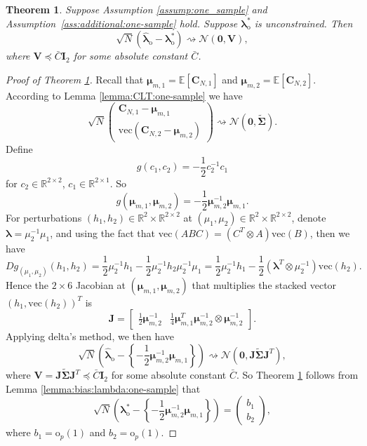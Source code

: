 \documentclass[12pt,letterpaper]{article}
\newtheorem{theorem}{Theorem}[section]
\begin{document}
\begin{theorem}\label{thm:one-sample:asymptotics}
Suppose Assumption \ref{assump:one_sample} and Assumption~\ref{ass:additional:one-sample} hold. Suppose $\boldsymbol{\lambda}_{\mathrm{o}}^*$ is unconstrained. Then 
$$\sqrt{N}\left(\hat{\boldsymbol{\lambda}}_{\mathrm{o}}-\boldsymbol{\lambda}_{\mathrm{o}}^*\right)\rightsquigarrow\mathcal{N}(\mathbf{0},\mathbf{V}),$$ 
where $\mathbf{V}\preceq\bar{C}\mathbf{I}_2$ for some absolute constant $\bar{C}$. 
\end{theorem}
\begin{proof}[Proof of Theorem \ref{thm:one-sample:asymptotics}]
Recall that $\boldsymbol{\mu}_{m,1}=\mathbb{E}[\mathbf{C}_{N,1}]$ and $\boldsymbol{\mu}_{m,2}=\mathbb{E}[\mathbf{C}_{N,2}]$. According to Lemma \ref{lemma:CLT:one-sample} we have  
$$\sqrt{N}\begin{pmatrix}
\mathbf{C}_{N,1}-\boldsymbol{\mu}_{m,1}\\
\mathrm{vec}(\mathbf{C}_{N,2}-\boldsymbol{\mu}_{m,2})
\end{pmatrix}\rightsquigarrow\mathcal{N}\left(\mathbf{0},\widetilde{\boldsymbol{\Sigma}}\right).$$
Define 
$$g(c_1,c_2)=-\frac{1}{2}c_2^{-1}c_1$$ 
for $c_2\in\mathbb{R}^{2\times 2}$, $c_1\in\mathbb{R}^{2\times 1}$. So $$g(\boldsymbol{\mu}_{m,1},\boldsymbol{\mu}_{m,2})=-\frac{1}{2}\boldsymbol{\mu}_{m,2}^{-1}\boldsymbol{\mu}_{m,1}.$$ 
For perturbations $(h_1,h_2)\in\mathbb{R}^2\times\mathbb{R}^{2\times 2}$ at $(\mu_1,\mu_2)\in\mathbb{R}^2\times\mathbb{R}^{2\times 2}$, denote $\boldsymbol{\lambda}=\mu_2^{-1}\mu_1$, and using the fact that $\mathrm{vec}(ABC)=(C^T\otimes A)\mathrm{vec}(B)$, then we have 
$$Dg_{(\mu_1,\mu_2)}(h_1,h_2)=\frac{1}{2}\mu_2^{-1}h_1-\frac{1}{2}\mu_2^{-1}h_2\mu_2^{-1}\mu_1=\frac{1}{2}\mu_2^{-1}h_1-\frac{1}{2}(\boldsymbol{\lambda}^T\otimes\mu_2^{-1})\mathrm{vec}(h_2).$$
Hence the $2\times 6$ Jacobian at $(\boldsymbol{\mu}_{m,1},\boldsymbol{\mu}_{m,2})$ that multiplies the stacked vector $(h_1,\mathrm{vec}(h_2))^T$ is 
$$\mathbf{J}=\begin{bmatrix}
\displaystyle\frac{1}{2}\boldsymbol{\mu}_{m,2}^{-1}&\displaystyle\frac{1}{4}\boldsymbol{\mu}_{m,1}^T\boldsymbol{\mu}_{m,2}^{-1}\otimes\boldsymbol{\mu}_{m,2}^{-1}
\end{bmatrix}.$$
Applying delta's method, we then have 
$$\sqrt{N}\left(\hat{\boldsymbol{\lambda}}_{\mathrm{o}}-\left\{-\frac{1}{2}\boldsymbol{\mu}_{m,2}^{-1}\boldsymbol{\mu}_{m,1}\right\}\right)\rightsquigarrow\mathcal{N}\left(\mathbf{0},\mathbf{J}\widetilde{\boldsymbol{\Sigma}}\mathbf{J}^T\right),$$
where $\mathbf{V}=\mathbf{J}\widetilde{\boldsymbol{\Sigma}}\mathbf{J}^T\preceq\bar{C}\mathbf{I}_2$ for some absolute constant $\bar{C}$. So Theorem \ref{thm:one-sample:asymptotics} follows from Lemma \ref{lemma:bias:lambda:one-sample} that
\begin{equation}
\sqrt{N}\left(\boldsymbol{\lambda}_{\mathrm{o}}^*-\left\{-\frac{1}{2}\boldsymbol{\mu}_{m,2}^{-1}\boldsymbol{\mu}_{m,1}\right\}\right)=\begin{pmatrix}
b_1\\
b_2
\end{pmatrix},
\end{equation}
where $b_1=\mathrm{o}_p(1)$ and $b_2=\mathrm{o}_p(1)$. 
\end{proof}
\end{document}
